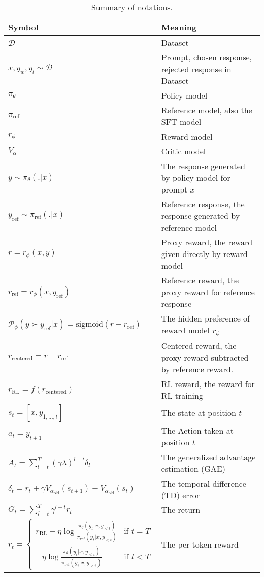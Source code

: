 \begin{table*}[t]
\centering
\small %
\setlength{\tabcolsep}{3.5pt}
\begin{tabular}{ll}
\toprule
\textbf{Symbol} & \textbf{Meaning} \\
\midrule
$\mathcal{D}$ & Dataset \\
$x,y_w,y_l\sim\mathcal{D}$ & Prompt, chosen response, rejected response in Dataset\\
$\pi_\theta$ & Policy model\\
$\pi_\text{ref}$ & Reference model, also the SFT model \\
$r_\phi$ & Reward model \\
$V_{\alpha}$ & Critic model \\
$y\sim\pi_\theta(.|x)$ & The response generated by policy model for prompt $x$\\
$y_{\text{ref}}\sim\pi_{\text{ref}}(.|x)$ & Reference response, the response generated by reference model \\
$r=r_\phi(x,y)$ & Proxy reward, the reward given directly by reward model\\
$r_{\text{ref}}=r_\phi(x,y_{\text{ref}})$ & Reference reward, the proxy reward for reference response\\
$\mathcal{P}_\phi(y\succ y_{\text{ref}}|x)=\text{sigmoid}(r-r_\text{ref})$ & The hidden preference of reward model $r_\phi$ \\
$r_{\text{centered}}=r-r_{\text{ref}}$ & Centered reward, the proxy reward subtracted by reference reward.\\
$r_{\text{RL}}=f(r_{\text{centered}})$ & RL reward, the reward for RL training \\
$s_t=[x,y_{1,...,t}]$ & The state at position $t$ \\
$a_t=y_{t+1}$ & The Action taken at position $t$ \\
$\hat{A}_t = \sum_{l=t}^{T} (\gamma\lambda)^{l-t} \delta_l$ & The generalized advantage estimation (GAE) \\
$\delta_t = r_t + \gamma V_{\alpha_{\text{old}}}(s_{t+1}) - V_{\alpha_{\text{old}}}(s_t)$ & The temporal difference (TD) error \\
$ G_t = \sum_{l=t}^T \gamma^{l-t} r_l$ & The return \\
$r_t=\begin{cases} 
       r_{\text{RL}}-\eta \log\frac{\pi_\theta(y_{t}|x,y_{<t})}{\pi_{\text{ref}}(y_{t}|x,y_{<t})} & \text{if } t = T\\
      -\eta \log\frac{\pi_\theta(y_{t}|x,y_{<t})}{\pi_{\text{ref}}(y_{t}|x,y_{<t})} & \text{if } t<T 
   \end{cases}$ & The per token reward \\
\bottomrule
\end{tabular}
\caption{Summary of notations.}
\label{table:notation}
\end{table*}